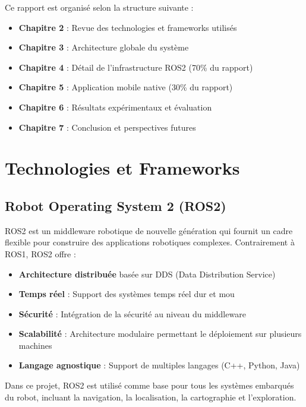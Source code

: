 \documentclass[12pt,a4paper,oneside]{report}
\begin{document}
Ce rapport est organisé selon la structure suivante :

\begin{itemize}
  \item \textbf{Chapitre 2} : Revue des technologies et frameworks utilisés
  \item \textbf{Chapitre 3} : Architecture globale du système
  \item \textbf{Chapitre 4} : Détail de l'infrastructure ROS2 (70\% du rapport)
  \item \textbf{Chapitre 5} : Application mobile native (30\% du rapport)
  \item \textbf{Chapitre 6} : Résultats expérimentaux et évaluation
  \item \textbf{Chapitre 7} : Conclusion et perspectives futures
\end{itemize}

\newpage

\chapter{Technologies et Frameworks}

\section{Robot Operating System 2 (ROS2)}

ROS2 est un middleware robotique de nouvelle génération qui fournit un cadre flexible pour construire des applications robotiques complexes. Contrairement à ROS1, ROS2 offre :

\begin{itemize}
  \item \textbf{Architecture distribuée} basée sur DDS (Data Distribution Service)
  \item \textbf{Temps réel} : Support des systèmes temps réel dur et mou
  \item \textbf{Sécurité} : Intégration de la sécurité au niveau du middleware
  \item \textbf{Scalabilité} : Architecture modulaire permettant le déploiement sur plusieurs machines
  \item \textbf{Langage agnostique} : Support de multiples langages (C++, Python, Java)
\end{itemize}

Dans ce projet, ROS2 est utilisé comme base pour tous les systèmes embarqués du robot, incluant la navigation, la localisation, la cartographie et l'exploration.
\end{document}

